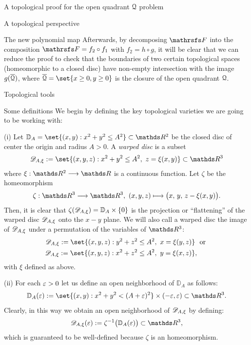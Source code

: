 \documentclass[11pt, a4paper, english, twoside, notitlepage, openright]{report}
\begin{document}
\begin{chapter}{A topological proof for the open quadrant $\mathcal{Q}$ problem}
\begin{section}{A topological perspective}
\begin{subsection}{The new polynomial map}
Afterwards, by decomposing $\FFF$ into the composition $\FFF = f_2 \circ f_1$ with $f_2 = h \circ g$, it will be clear that we can reduce the proof to check that the boundaries of two certain topological spaces (homeomorphic to a closed disc) have non-empty intersection with the image $g(\overline{\mathcal{Q}})$, where $\overline{\Qu} = \set{x \ge 0, y \ge 0}$ is the closure of the open quadrant $\mathcal{Q}$.
\end{subsection}
\end{section}
\begin{section}{Topological tools}
\begin{subsection}{Some definitions}\label{topDefs}
We begin by defining the key topological varieties we are going to be working with:
\begin{definitions}
(i) Let ${\mathbb D}_A = \set{(x,y): x^2+y^2 \le A^2} \subset \R^2$ be the closed disc of center the origin and radius $A>0$. A \textit{warped disc} is a subset 
$$\D_{A,\xi}:=\set{(x,y,z): x^2+y^2\le A^2,\ z=\xi(x,y)}\subset\R^3$$
where $\xi:\R^2\longrightarrow\R$ is a continuous function. Let $\zeta$ be the homeomorphism
$$
\zeta:\R^3\longrightarrow\R^3,\ (x,y,z)\longmapsto\big(x,\, y,\, z-\xi(x,y)\big).
$$
Then, it is clear that $\zeta(\mathscr{D}_{A,\xi}) = {\mathbb D}_A\times\{0\}$ is the projection or ``flattening'' of the warped disc $\mathscr{D}_{A,\xi}$ onto the $x-y$ plane. We will also call a warped disc the image of $\mathscr{D}_{A,\xi}$ under a permutation of the variables of $\R^3$:
\begin{equation*}
\begin{aligned}
\D_{A,\xi}:=\set{(x,y,z): y^2+z^2\le A^2,\ x=\xi(y,z)}& \ \text{ or } \\
\D_{A,\xi}:=\set{(x,y,z): x^2+z^2\le A^2,\ y=\xi(x,z)}&,
\end{aligned}
\end{equation*}
with $\xi$ defined as above.

(ii) For each $\varepsilon>0$ let us define an open neighborhood of ${\mathbb D}_A$ as follows:
$$
{\mathbb D}_A(\eps):=\set{(x,y):x^2+y^2<(A+\eps)^2}\times(-\eps,\eps)\subset\R^3.
$$ 
Clearly, in this way we obtain an open neighborhood of $\mathscr{D}_{A,\xi}$ by defining:
$$
\D_{A,\xi}(\eps):=\zeta^{-1}\big({\mathbb D}_A(\eps)\big) \subset \R^3,
$$
which is guaranteed to be well-defined because $\zeta$ is an homeomorphism.
\end{definitions}


\end{subsection}
\end{section}
\end{chapter}
\end{document}
